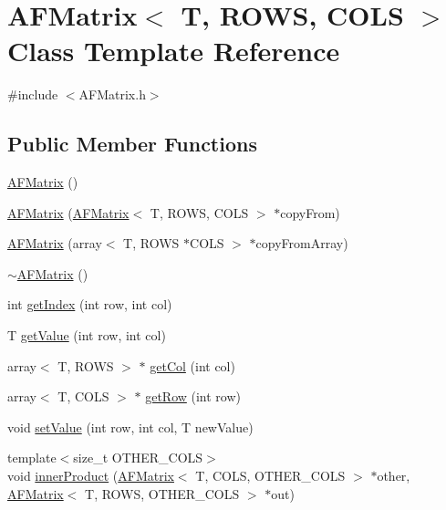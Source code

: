 \hypertarget{class_a_f_matrix}{}\section{A\+F\+Matrix$<$ T, R\+O\+WS, C\+O\+LS $>$ Class Template Reference}
\label{class_a_f_matrix}


{\ttfamily \#include $<$A\+F\+Matrix.\+h$>$}

\subsection*{Public Member Functions}
\begin{DoxyCompactItemize}
\item 
\hyperlink{class_a_f_matrix_a6ccd1bdad16dfa7ef38db5e0fc4e0e2b}{A\+F\+Matrix} ()
\item 
\hyperlink{class_a_f_matrix_ae76418eb02f3f9b84ee13aebaeca564a}{A\+F\+Matrix} (\hyperlink{class_a_f_matrix}{A\+F\+Matrix}$<$ T, R\+O\+WS, C\+O\+LS $>$ $\ast$copy\+From)
\item 
\hyperlink{class_a_f_matrix_a8c1d7fdbf92372be7e13cd4cccfb7714}{A\+F\+Matrix} (array$<$ T, R\+O\+WS $\ast$C\+O\+LS $>$ $\ast$copy\+From\+Array)
\item 
\hyperlink{class_a_f_matrix_a657752979ec2d7bad591e3def1f4bcc7}{$\sim$\+A\+F\+Matrix} ()
\item 
int \hyperlink{class_a_f_matrix_aff522a072446367c8e224c955a7743c1}{get\+Index} (int row, int col)
\item 
T \hyperlink{class_a_f_matrix_a0e36b5c6f333ac3d6508d5b00c92852c}{get\+Value} (int row, int col)
\item 
array$<$ T, R\+O\+WS $>$ $\ast$ \hyperlink{class_a_f_matrix_ae6de9932dfad5cd7d4ad9887907155cb}{get\+Col} (int col)
\item 
array$<$ T, C\+O\+LS $>$ $\ast$ \hyperlink{class_a_f_matrix_a0ddbf6fe5a2aa085d7f2bc7b99bfa8bc}{get\+Row} (int row)
\item 
void \hyperlink{class_a_f_matrix_a149a1374f175489a1933bda36d0e9a9e}{set\+Value} (int row, int col, T new\+Value)
\item 
{\footnotesize template$<$size\+\_\+t O\+T\+H\+E\+R\+\_\+\+C\+O\+LS$>$ }\\void \hyperlink{class_a_f_matrix_a2c3183f964593d1bc52f6dc09429dbcc}{inner\+Product} (\hyperlink{class_a_f_matrix}{A\+F\+Matrix}$<$ T, C\+O\+LS, O\+T\+H\+E\+R\+\_\+\+C\+O\+LS $>$ $\ast$other, \hyperlink{class_a_f_matrix}{A\+F\+Matrix}$<$ T, R\+O\+WS, O\+T\+H\+E\+R\+\_\+\+C\+O\+LS $>$ $\ast$out)

\end{DoxyCompactItemize}
